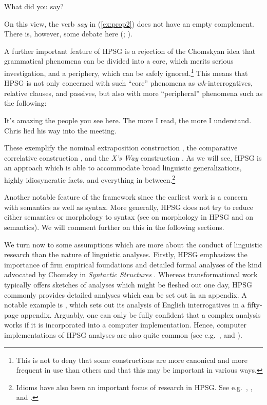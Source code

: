 \documentclass[output=paper
	        ,collection
	        ,collectionchapter
 	        ,biblatex
                ,babelshorthands
                ,newtxmath
                ,draftmode
                ,colorlinks, citecolor=brown
]{langscibook}
\begin{document}
\ea\label{ex:prop2}
What did you say?
\z

\noindent
On this view, the verb \emph{say} in (\ref{ex:prop2}) does not have an empty complement. There is,
however, some debate here (\citealp{SF94a,Mueller2004e};
).

A further important feature of HPSG is a rejection of the Chomskyan idea that grammatical phenomena can be divided into a core, which merits serious investigation, and a periphery, which can be safely ignored.\footnote{%
  This is not to deny that some constructions are more canonical and more frequent in use than others and that this may be important in various ways.}
%
This means that HPSG is not only concerned with such ``core'' phenomena as \emph{wh}-interrogatives, relative clauses, and passives, but also with more ``peripheral'' phenomena such as the following:


\eal\label{ex:prop3}
\ex\label{ex:prop3a}
It’s amazing the people you see here.
\ex\label{ex:prop3b}
The more I read, the more I understand.
\ex\label{ex:prop3c}
Chris lied his way into the meeting.
\zl

\noindent
These exemplify the nominal extraposition construction \citep{ML96a}, the comparative correlative construction \citep{Abeille2006a,AB2008a-u,Borsley2011a-u}, and the \emph{X’s Way} construction \citep[Section~7.4]{Sag2012a}. As we will see, HPSG is an approach which is able to accommodate broad linguistic generalizations, highly idiosyncratic facts, and everything in between.\footnote{%
  Idioms have also been an important focus of research in HPSG. See e.g.\ , , and .}
%

Another notable feature of the framework since the earliest work is a concern with semantics as well as syntax. More generally, HPSG does not try to reduce either semantics or morphology to syntax (see  on morphology in HPSG and  on semantics). We will comment further on this in the following sections.

We turn now to some assumptions which are more about the conduct of linguistic research than the
nature of linguistic analyses. Firstly, HPSG emphasizes the importance of firm empirical foundations
and detailed formal analyses of the kind advocated by Chomsky in \emph{Syntactic Structures}
\citep[]{Chomsky57a}. Whereas transformational work typically offers sketches of analyses which might be fleshed out one day, HPSG commonly provides detailed analyses which can be set out in an appendix. A notable example is \citet{GSag2000a-u}, which sets out its analysis of English interrogatives in a fifty-page appendix. Arguably, one can only be fully confident that a complex analysis works if it is incorporated into a computer implementation. Hence, computer implementations of HPSG analyses are also quite common (see e.g.\ \citealp{Babel,MuellerCoreGram,Copestake2002a,BDFPS2010a-u,Bender2016}, and ).
\end{document}
